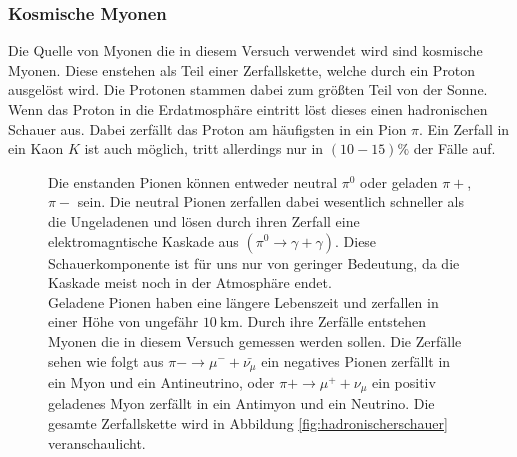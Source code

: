 \subsubsection{Kosmische Myonen}
Die Quelle von Myonen die in diesem Versuch verwendet wird sind kosmische Myonen.
Diese enstehen als Teil einer Zerfallskette, welche durch ein Proton ausgelöst wird.
Die Protonen stammen dabei zum größten Teil von der Sonne.
Wenn das Proton in die Erdatmosphäre eintritt löst dieses einen hadronischen Schauer aus.
Dabei zerfällt das Proton am häufigsten in ein Pion $\pi$.
Ein Zerfall in ein Kaon $K$ ist auch möglich, tritt allerdings nur in $(10-15)\%$ der Fälle auf.
\FloatBarrier
\begin{figure}
    \begin{minipage}{0.55\textwidth}
Die enstanden Pionen können entweder neutral $\pi^0$ oder geladen $\pi+$, $\pi-$ sein.
Die neutral Pionen zerfallen dabei wesentlich schneller als die Ungeladenen und lösen durch ihren Zerfall eine elektromagntische Kaskade aus $(\pi^0 \rightarrow \gamma +\gamma)$.
Diese Schauerkomponente ist für uns nur von geringer Bedeutung, da die Kaskade meist noch in der Atmosphäre endet.\\
Geladene Pionen haben eine längere Lebenszeit und zerfallen in einer Höhe von ungefähr $\SI{10}{\kilo\meter}$.
Durch ihre Zerfälle entstehen Myonen die in diesem Versuch gemessen werden sollen.
Die Zerfälle sehen wie folgt aus $\pi-\rightarrow \mu^- +\bar{\nu_\mu}$ ein negatives Pionen zerfällt in ein Myon und ein Antineutrino, oder $\pi+\rightarrow \mu^+ + \nu_\mu$ ein positiv geladenes Myon zerfällt in ein Antimyon und ein Neutrino.
Die gesamte Zerfallskette wird in Abbildung \ref{fig:hadronischerschauer} veranschaulicht.
\end{minipage}
\hfill
\begin{minipage}{0.4\textwidth}

\end{minipage}
\end{figure}
